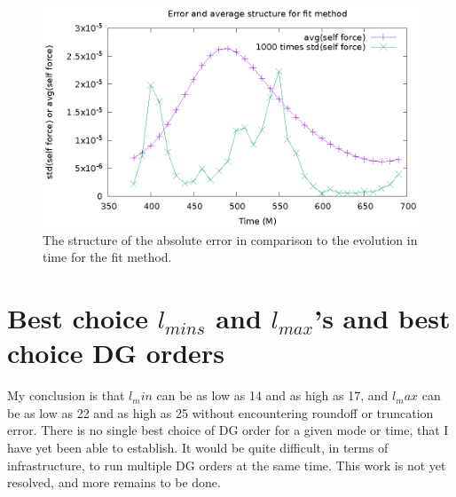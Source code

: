 \begin{figure}
  \includegraphics{structErrFitMethod}
  \caption{The structure of the absolute error in comparison to the evolution in time for the fit method.}
  \label{twopeaks}
\end{figure}


\section{Best choice $l_{mins}$ and $l_{max}$'s and best choice DG orders}

My conclusion is that $l_min$ can be as low as 14 and as high as 17, and $l_max$ can be as low as 22 and as high as 25 without encountering roundoff or truncation error. There is no single best choice of DG order for a given mode or time, that I have yet been able to establish. It would be quite difficult, in terms of infrastructure, to run multiple DG orders at the same time. This work is not yet resolved, and more remains to be done. 


